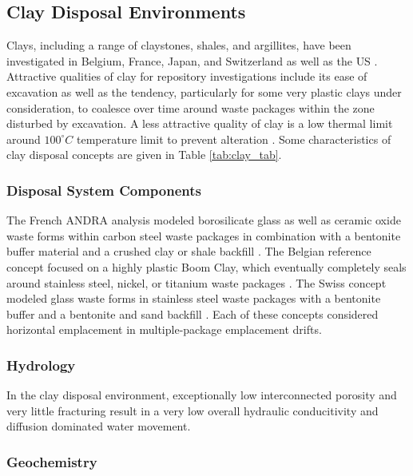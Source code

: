 \subsection{Clay Disposal Environments}

Clays, including a range of claystones, shales, and argillites, have been 
investigated in Belgium, France, Japan, and Switzerland 
\cite{von_lensa_red-impact_2008} as well as the  \gls{US} 
\cite{clayton_generic_2011}. Attractive qualities 
of clay for repository investigations include its ease of excavation as well as
the tendency, particularly for some very plastic clays under consideration, to 
coalesce over time around waste packages within the zone disturbed by 
excavation.  A less attractive quality of clay is a 
low thermal limit around $100^{\circ}C$ temperature limit to prevent alteration 
\cite{hardin_generic_2011}.
Some characteristics of clay disposal 
concepts are given in Table \ref{tab:clay_tab}.   



\subsubsection{Disposal System Components}

The French \gls{ANDRA}  analysis modeled borosilicate glass as well as ceramic 
oxide waste forms within carbon steel waste packages in combination with a bentonite 
buffer material and a crushed clay or shale backfill \cite{andra_argile:_2005}.
The Belgian reference concept focused on a highly plastic Boom Clay, which 
eventually completely seals around stainless steel, nickel, or titanium waste 
packages \cite{ondraf-niras_technical_2001}.  The Swiss concept modeled glass 
waste forms in stainless steel waste packages with a bentonite buffer and a 
bentonite and sand backfill
\cite{johnson_calculations_2002}. Each of these concepts considered 
horizontal emplacement in multiple-package emplacement drifts. 


\subsubsection{Hydrology}

In the clay disposal environment, exceptionally low interconnected porosity and 
very little fracturing result in a very low overall hydraulic conducitivity and 
diffusion dominated water movement. 

\subsubsection{Geochemistry}

